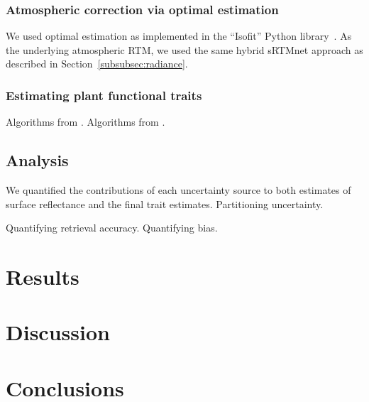 \documentclass[draft]{agujournal2019}
\begin{document}
\subsubsection{Atmospheric correction via optimal estimation}\label{subsubsec:isofit}

We used optimal estimation as implemented in the ``Isofit'' Python library~\cite{thompson2019optimal,thompson2018optimal}.
As the underlying atmospheric RTM, we used the same hybrid sRTMnet approach as described in Section~\ref{subsubsec:radiance}.

\subsubsection{Estimating plant functional traits}\label{subsubsec:traits}

Algorithms from .
Algorithms from .

\subsection{Analysis}\label{subsec:analysis}

We quantified the contributions of each uncertainty source to both estimates of surface reflectance and the final trait estimates.
Partitioning uncertainty.

Quantifying retrieval accuracy.
Quantifying bias.

\section{Results}\label{sec:results}

\section{Discussion}\label{sec:discussion}

\section{Conclusions}


\end{document}
